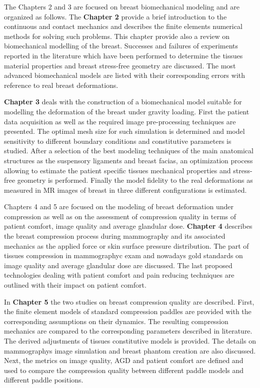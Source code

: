 The Chapters 2 and 3 are focused on breast biomechanical  modeling and are organized as follows. The \textbf{Chapter 2} provide a brief introduction to the continuous and contact mechanics and describes the finite elements numerical methods for solving such problems.  This chapter provide also a review on biomechanical modelling of the breast. Successes and failures of experiments reported in the literature which have been performed to determine the tissues material properties and breast stress-free geometry are discussed. The most advanced biomechanical models are listed with their corresponding errors with reference to real breast deformations. 

\textbf{Chapter 3} deals with the construction of a biomechanical model suitable for modelling the
deformation of the breast under gravity loading. First the patient data acquisition as well as the required image pre-processing techniques are presented. The optimal mesh size for such simulation is determined and model sensitivity to different boundary conditions and constitutive parameters is studied. After a selection of the best modeling techniques of the main anatomical structures as the suspensory ligaments and breast facias, an optimization process allowing to estimate the patient specific tissues mechanical properties and stress-free geometry is performed.
Finally the model fidelity to the real deformations as measured in MR images of breast in three different configurations is estimated.

Chapters 4 and 5 are focused on the modeling of breast deformation under compression as well as on the assessment of compression quality in terms of patient comfort, image quality and average glandular dose.  \textbf{Chapter 4} describes the breast compression process during mammography and its associated mechanics as the applied force or skin surface pressure distribution. The part of tissues compression in mammographyc exam and nowadays gold standards on image quality and average glandular dose are discussed. The last proposed technologies dealing with patient comfort and pain reducing techniques are outlined with their impact on patient comfort.      

In \textbf{Chapter 5} the two studies on breast compression quality are described. First, the finite element models of standard compression paddles are provided with the corresponding assumptions on their dynamics. The resulting compression mechanics are compared to the corresponding parameters described in literature. The derived adjustments of tissues constitutive models is provided. The details on mammographys image simulation and breast phantom creation are also discussed. Next, the metrics on image quality, AGD and patient comfort are defined and used to compare the compression quality between different paddle models and different paddle positions. 
 
